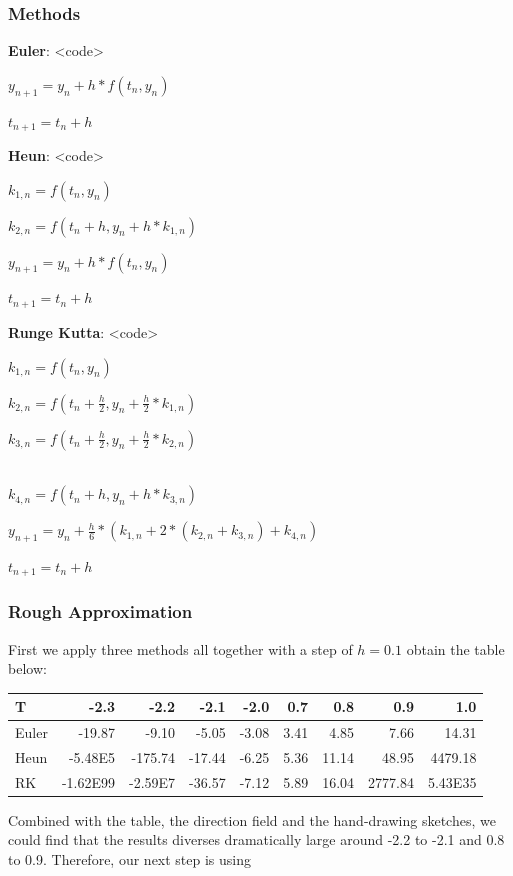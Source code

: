 \documentclass[cap,cs5size,nospace,indent,fancyhdr]{ctexart}
\begin{document}
\subsubsection{Methods}
\begin{multicols}{2}	
	\textbf{Euler}: <code>
	
	$ y_{n+1} = y_n+h*f(t_n, y_n)$
	
	$ t_{n+1} = t_n+h$
	
	\vfill\null
	\columnbreak

	\textbf{Heun}: <code>
	
	$ k_{1,n} = f(t_n,y_n)$
	
	$ k_{2,n} = f(t_n+h, y_n+h*k_{1,n})$
	
	$ y_{n+1} = y_n+h*f(t_n, y_n)$
	
	$ t_{n+1} = t_n+h$
	

	\textbf{Runge Kutta}: <code>
	
	$ k_{1,n} = f(t_n,y_n)$
	
	$ k_{2,n} = f(t_n+\frac{h}{2}, y_n+\frac{h}{2}*k_{1,n})$

	$ k_{3,n} = f(t_n+\frac{h}{2}, y_n+\frac{h}{2}*k_{2,n})$

	~\\

	$ k_{4,n} = f(t_n+h, y_n+h*k_{3,n})$
	
	$ y_{n+1} = y_n+\frac{h}{6}*(k_{1,n}+2*(k_{2,n}+k_{3,n})+k_{4,n})$
	
	$ t_{n+1} = t_n+h$

	\vfill\null
	\columnbreak
\end{multicols}

\subsubsection{Rough Approximation}
\noindent First we apply three methods all together with a step of $h = 0.1$ obtain the table below:
\begin{table}[!htb]
	\begin{center}
		\begin{tabular}{l|r|r|r|r|r|r|r|r}
			\textbf{T} & \textbf{-2.3} & \textbf{-2.2} &\textbf{-2.1} & \textbf{-2.0} & \textbf{0.7} & \textbf{0.8} & \textbf{0.9} & \textbf{1.0}  \\
			\hline
			Euler & -19.87 & -9.10 & -5.05 & -3.08 & 3.41 & 4.85 & 7.66 & 14.31\\	
			\hline
			Heun  &-5.48E5&-175.74&-17.44 & -6.25 & 5.36 & 11.14 & 48.95 & 4479.18\\
			\hline
			RK & -1.62E99 & -2.59E7 & -36.57 & -7.12 & 5.89 & 16.04 & 2777.84 & 5.43E35\\
		\end{tabular}
	\end{center}
\end{table}

Combined with the table, the direction field and the hand-drawing sketches, we could find that the results diverses dramatically large around -2.2 to -2.1 and 0.8 to 0.9. Therefore, our next step is using 
\end{document}

